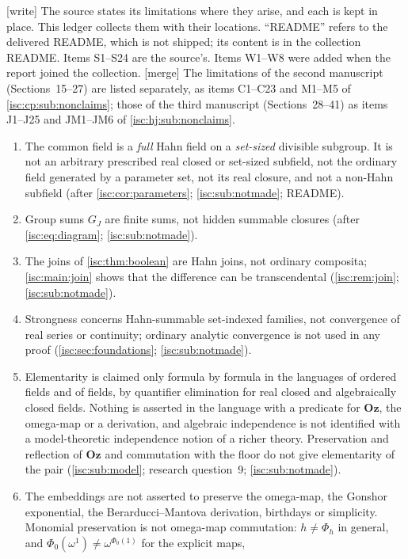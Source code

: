 \documentclass[11pt,letterpaper]{article}
\theoremstyle{definition}
\theoremstyle{remark}
\newcommand{\Oz}{\mathbf{Oz}}
\newcommand{\wtag}{\textup{[write]}}%
\newcommand{\mtag}{\textup{[merge]}}%
\numberwithin{equation}{section}
\begin{document}
\wtag{} The source states its limitations where they arise, and each is
kept in place. This ledger collects them with their locations. ``README''
refers to the delivered README, which is not shipped; its content is in the
collection README. Items S1--S24 are the source's. Items W1--W8 were added
when the report joined the collection. \mtag{} The limitations of the second
manuscript (Sections~15--27) are listed separately, as items C1--C23 and
M1--M5 of \cref{isc:cp:sub:nonclaims}; those of the third manuscript
(Sections~28--41) as items J1--J25 and JM1--JM6 of
\cref{isc:hj:sub:nonclaims}.
\begin{enumerate}[label=S\arabic*.,leftmargin=2.6em,itemsep=2pt]
\item The common field is a \emph{full} Hahn field on a \emph{set-sized}
divisible subgroup. It is not an arbitrary prescribed real closed or
set-sized subfield, not the ordinary field generated by a parameter set,
not its real closure, and not a non-Hahn subfield
(after \cref{isc:cor:parameters}; \cref{isc:sub:notmade}; README).
\item Group sums $G_J$ are finite sums, not hidden summable closures
(after \eqref{isc:eq:diagram}; \cref{isc:sub:notmade}).
\item The joins of \cref{isc:thm:boolean} are Hahn joins, not ordinary
composita; \cref{isc:main:join} shows that the difference can be
transcendental (\cref{isc:rem:join}; \cref{isc:sub:notmade}).
\item Strongness concerns Hahn-summable set-indexed families, not
convergence of real series or continuity; ordinary analytic convergence is
not used in any proof (\cref{isc:sec:foundations}; \cref{isc:sub:notmade}).
\item Elementarity is claimed only formula by formula in the languages of
ordered fields and of fields, by quantifier elimination for real closed and
algebraically closed fields. Nothing is asserted in the language with a
predicate for $\Oz$, the omega-map or a derivation, and algebraic
independence is not identified with a model-theoretic independence notion
of a richer theory. Preservation and reflection of $\Oz$ and commutation
with the floor do not give elementarity of the pair
(\cref{isc:sub:model}; research question~9; \cref{isc:sub:notmade}).
\item The embeddings are not asserted to preserve the omega-map, the Gonshor
exponential, the Berarducci--Mantova derivation, birthdays or simplicity.
Monomial preservation is not omega-map commutation: $h\ne\Phi_h$ in
general, and $\Phi_0(\omega^1)\ne\omega^{\Phi_0(1)}$ for the explicit maps,

\end{enumerate}
\end{document}
